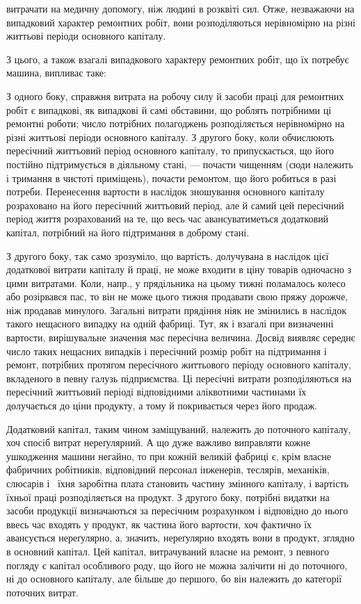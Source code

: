 \parcont{}  %
витрачати на медичну допомогу, ніж людині в розквіті сил. Отже, незважаючи на випадковий характер
ремонтних робіт, вони розподіляються нерівномірно на різні життьові періоди основного капіталу.

З цього, а також взагалі випадкового характеру ремонтних робіт, що їх потребує машина, випливає
таке:

З одного боку, справжня витрата на робочу силу й засоби праці для ремонтних робіт є випадкові, як
випадкові й самі обставини, що роблять потрібними ці ремонтні роботи; число потрібних полагоджень
розподіляється нерівномірно на різні життьові періоди основного капіталу. З другого боку, коли
обчислюють пересічний життьовий період основного капіталу, то припускається, що його постійно
підтримується в діяльному
стані, — почасти чищенням (сюди належить і тримання в чистоті приміщень), почасти ремонтом, що його
робиться в разі потреби. Перенесення вартости в наслідок зношування основного капіталу розраховано
на його пересічний життьовий період, але й самий цей пересічний період життя розрахований на те, що
весь час авансуватиметься додатковий капітал, потрібний на його підтримання в доброму стані.

З другого боку, так само зрозуміло, що вартість, долучувана в наслідок цієї додаткової витрати
капіталу й праці, не може входити в ціну товарів одночасно з цими витратами. Коли, напр., у
прядільника на цьому тижні поламалось колесо або розірвався пас, то він не може цього тижня
продавати свою пряжу дорожче, ніж продавав минулого. Загальні витрати прядіння ніяк не змінились в
наслідок такого нещасного випадку на одній фабриці. Тут, як і взагалі при визначенні вартости,
вирішувальне значення має пересічна величина. Досвід виявляє середнє число таких нещасних випадків і
пересічний розмір робіт на підтримання і ремонт, потрібних протягом пересічного життьового періоду
основного капіталу, вкладеного в певну галузь підприємства. Ці пересічні витрати розподіляються на
пересічний життьовий періоді відповідними аліквотними частинами їх долучається до ціни продукту, а
тому й покривається через його продаж.

Додатковий капітал, таким чином заміщуваний, належить до поточного капіталу, хоч спосіб витрат
нереґулярний. А що дуже важливо виправляти кожне ушкодження машини негайно, то при кожній великій
фабриці є, крім власне фабричних робітників, відповідний персонал інженерів, теслярів, механіків,
слюсарів і~ їхня заробітна плата становить частину змінного капіталу, і вартість їхньої праці
розподіляється на
продукт. З другого боку, потрібні видатки на засоби продукції визначаються за пересічним розрахунком
і відповідно до нього ввесь час входять у продукт, як частина його вартости, хоч фактично їх
авансується нереґулярно, а, значить, нереґулярно входять вони в продукт, зглядно в основний капітал.
Цей капітал, витрачуваний власне на ремонт, з певного погляду є капітал особливого роду, що його не
можна залічити ні до поточного, ні до основного капіталу, але більше до першого, бо він належить до
категорії поточних витрат.

